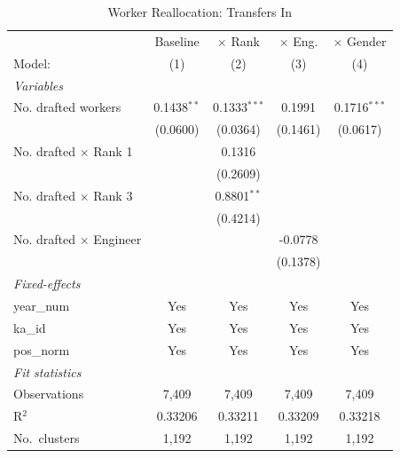 \begin{table}[htbp]
\centering
\caption{Worker Reallocation: Transfers In}
\label{tab:reallocation}
\begin{threeparttable}
\begin{tabular}{lcccc}
   \tabularnewline \midrule \midrule
                                  & Baseline      & $\times$ Rank  & $\times$ Eng.  & $\times$ Gender \\    
   Model:                         & (1)           & (2)            & (3)            & (4)\\  
   \midrule
   \emph{Variables}\\
   No. drafted workers            & 0.1438$^{**}$ & 0.1333$^{***}$ & 0.1991         & 0.1716$^{***}$\\   
                                  & (0.0600)      & (0.0364)       & (0.1461)       & (0.0617)\\   
   No. drafted $\times$ Rank 1    &               & 0.1316         &                &   \\   
                                  &               & (0.2609)       &                &   \\   
   No. drafted $\times$ Rank 3    &               & 0.8801$^{**}$  &                &   \\   
                                  &               & (0.4214)       &                &   \\   
   No. drafted $\times$ Engineer  &               &                & -0.0778        &   \\   
                                  &               &                & (0.1378)       &   \\   
   \midrule
   \emph{Fixed-effects}\\
   year\_num                      & Yes           & Yes            & Yes            & Yes\\  
   ka\_id                         & Yes           & Yes            & Yes            & Yes\\  
   pos\_norm                      & Yes           & Yes            & Yes            & Yes\\  
   \midrule
   \emph{Fit statistics}\\
   Observations                   & 7,409         & 7,409          & 7,409          & 7,409\\  
   R$^2$                          & 0.33206       & 0.33211        & 0.33209        & 0.33218\\  
   No.\ clusters & 1,192         & 1,192          & 1,192          & 1,192\\  

\end{tabular}
\end{threeparttable}
\end{table}
